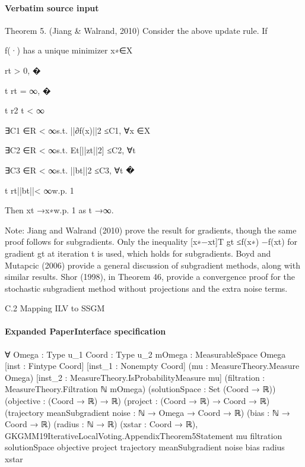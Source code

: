 \documentclass[10pt]{article}
\begin{document}
\paragraph{Verbatim source input}
\begin{ReviewVerbatim}
Theorem 5. (Jiang & Walrand, 2010) Consider the above update rule. If

f(·) has a unique minimizer x∗∈X

rt > 0,
�

t
rt = ∞,
�

t
r2
t < ∞

∃C1 ∈R < ∞s.t. ||∂f(x)||2 ≤C1, ∀x ∈X

∃C2 ∈R < ∞s.t. Et[||zt||2] ≤C2, ∀t

∃C3 ∈R < ∞s.t. ||bt||2 ≤C3, ∀t
�

t
rt||bt||< ∞w.p. 1

Then xt →x∗w.p. 1 as t →∞.

Note: Jiang and Walrand (2010) prove the result for gradients, though the same proof
follows for subgradients. Only the inequality [x∗−xt]T gt ≤f(x∗) −f(xt) for gradient gt
at iteration t is used, which holds for subgradients. Boyd and Mutapcic (2006) provide
a general discussion of subgradient methods, along with similar results. Shor (1998), in
Theorem 46, provide a convergence proof for the stochastic subgradient method without
projections and the extra noise terms.

C.2 Mapping ILV to SSGM
\end{ReviewVerbatim}


\paragraph{Expanded PaperInterface specification}
\begin{ReviewVerbatim}
∀ {Omega : Type u_1} {Coord : Type u_2} {mOmega : MeasurableSpace Omega} [inst : Fintype Coord]
  [inst_1 : Nonempty Coord] (mu : MeasureTheory.Measure Omega) [inst_2 : MeasureTheory.IsProbabilityMeasure mu]
  (filtration : MeasureTheory.Filtration ℕ mOmega) (solutionSpace : Set (Coord → ℝ)) (objective : (Coord → ℝ) → ℝ)
  (project : (Coord → ℝ) → Coord → ℝ) (trajectory meanSubgradient noise : ℕ → Omega → Coord → ℝ) (bias : ℕ → Coord → ℝ)
  (radius : ℕ → ℝ) (xstar : Coord → ℝ),
  GKGMM19IterativeLocalVoting.AppendixTheorem5Statement mu filtration solutionSpace objective project trajectory
    meanSubgradient noise bias radius xstar
\end{ReviewVerbatim}
\end{document}
